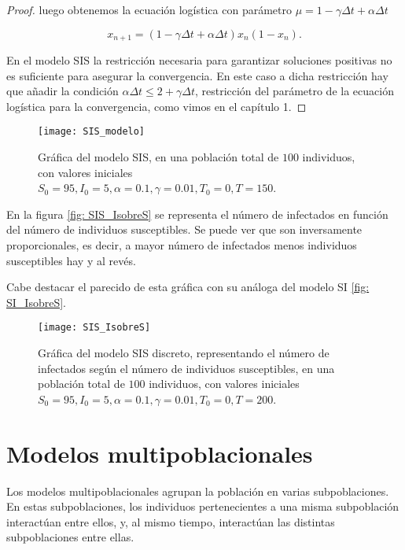 \begin{proof}
luego obtenemos la ecuación logística con parámetro $\mu = 1-\gamma \Delta t+\alpha\Delta t $

$$x_{n+1} = (1 - \gamma \Delta t +\alpha \Delta t)x_n(1-x_n).$$

En el modelo SIS la restricción necesaria para garantizar soluciones positivas no es suficiente para asegurar la convergencia. En este caso a dicha restricción hay que añadir la condición $\alpha \Delta t \leq 2+\gamma \Delta t$, restricción del parámetro de la ecuación logística para la convergencia, como vimos en el capítulo 1.

\end{proof}


\begin{figure}
\begin{center}
\caption{Gráfica del modelo SIS, en una población total de $100$ individuos, con valores iniciales $S_0=95, I_0 = 5, \alpha = 0.1, \gamma=0.01, T_0 = 0, T = 150$.}
\texttt{[image: SIS\_modelo]}
\end{center}
\end{figure}

En la figura \eqref{fig: SIS_IsobreS} se representa el número de infectados en función del número de individuos susceptibles. Se puede ver que son inversamente proporcionales, es decir, a mayor número de infectados menos individuos susceptibles hay y al revés.

Cabe destacar el parecido de esta gráfica con su análoga del modelo SI \eqref{fig: SI_IsobreS}.

\begin{figure}
\begin{center}
\caption{Gráfica del modelo SIS discreto, representando el número de infectados según el número de individuos susceptibles, en una población total de $100$ individuos, con valores iniciales $S_0=95, I_0 = 5, \alpha = 0.1, \gamma=0.01, T_0 = 0, T = 200$.}
\label{fig: SIS_IsobreS}
\texttt{[image: SIS\_IsobreS]}
\end{center}
\end{figure}



\section{Modelos multipoblacionales}

Los modelos multipoblacionales agrupan la población en varias subpoblaciones. En estas subpoblaciones, los individuos pertenecientes a una misma subpoblación interactúan entre ellos, y, al mismo tiempo, interactúan las distintas subpoblaciones entre ellas.

